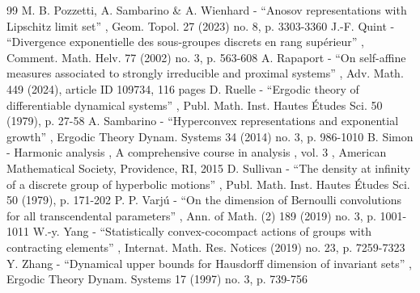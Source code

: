 \documentclass[10pt]{amsart}
\begin{document}
\begin{thebibliography}{99}
 M. B. Pozzetti, A. Sambarino \& A. Wienhard - “Anosov representations with Lipschitz limit set” , Geom. Topol. 27 (2023) no. 8, p. 3303-3360
 J.-F. Quint - “Divergence exponentielle des sous-groupes discrets en rang supérieur” , Comment. Math. Helv. 77 (2002) no. 3, p. 563-608
 A. Rapaport - “On self-affine measures associated to strongly irreducible and proximal systems” , Adv. Math. 449 (2024), article ID 109734, 116 pages
 D. Ruelle - “Ergodic theory of differentiable dynamical systems” , Publ. Math. Inst. Hautes Études Sci. 50 (1979), p. 27-58
 A. Sambarino - “Hyperconvex representations and exponential growth” , Ergodic Theory Dynam. Systems 34 (2014) no. 3, p. 986-1010
 B. Simon - Harmonic analysis , A comprehensive course in analysis , vol. 3 , American Mathematical Society, Providence, RI, 2015
 D. Sullivan - “The density at infinity of a discrete group of hyperbolic motions” , Publ. Math. Inst. Hautes Études Sci. 50 (1979), p. 171-202
 P. P. Varjú - “On the dimension of Bernoulli convolutions for all transcendental parameters” , Ann. of Math. (2) 189 (2019) no. 3, p. 1001-1011
 W.-y. Yang - “Statistically convex-cocompact actions of groups with contracting elements” , Internat. Math. Res. Notices (2019) no. 23, p. 7259-7323
 Y. Zhang - “Dynamical upper bounds for Hausdorff dimension of invariant sets” , Ergodic Theory Dynam. Systems 17 (1997) no. 3, p. 739-756
\end{thebibliography}
\end{document}
